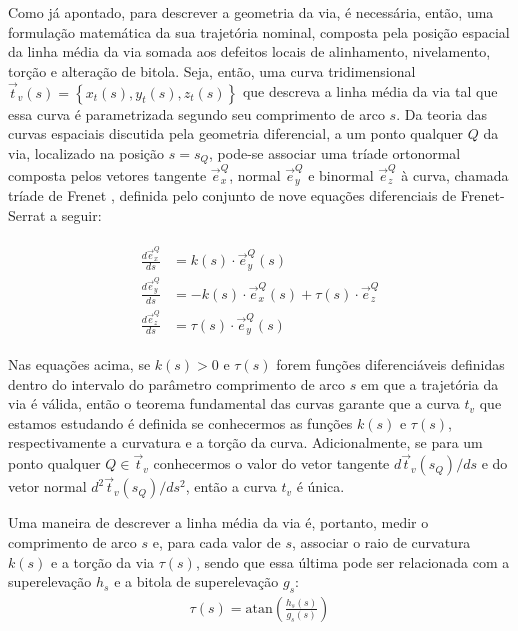 Como já apontado, para descrever a geometria da via, é necessária, então, uma formulação matemática da sua trajetória nominal, composta pela posição espacial da linha média da via somada aos defeitos locais de alinhamento, nivelamento, torção e alteração de bitola. Seja, então, uma curva tridimensional $\vec{t}_v(s) = \left\{x_t(s),y_t(s),z_t(s)\right\}$ que descreva a linha média da via tal que essa curva é parametrizada segundo seu comprimento de arco $s$. Da teoria das curvas espaciais discutida pela geometria diferencial, a um ponto qualquer $Q$ da via, localizado na posição $s=s_Q$, pode-se associar uma tríade ortonormal composta pelos vetores tangente $\vec{e}_x^Q$, normal $\vec{e}_y^Q$ e binormal $\vec{e}_z^Q$ à curva, chamada tríade de Frenet \cite{tenenblat_introducao_2008}, definida pelo conjunto de nove equações diferenciais de Frenet-Serrat a seguir:

\begin{align}
    \begin{split}
        \frac{d\vec{e}_x^Q}{ds} &= k(s)\cdot \vec{e}_y^Q(s) \\
        \frac{d\vec{e}_y^Q}{ds} &= -k(s)\cdot \vec{e}_x^Q(s) + \tau(s)\cdot\vec{e}_z^Q \\
        \frac{d\vec{e}_z^Q}{ds} &= \tau(s)\cdot \vec{e}_y^Q(s)
    \end{split}
    \label{eq: equações de Frenet-Serrat}
\end{align}

Nas equações acima, se $k(s) > 0 $ e $\tau(s)$ forem funções diferenciáveis definidas dentro do intervalo do parâmetro comprimento de arco $s$ em que a trajetória da via é válida, então o teorema fundamental das curvas garante que a curva $t_v$ que estamos estudando é definida se conhecermos as funções $k(s)$ e $\tau(s)$, respectivamente a curvatura e a torção da curva. Adicionalmente, se para um ponto qualquer $Q\in \vec{t}_v$ conhecermos o valor do vetor tangente $d\vec{t}_v(s_Q)/ds$ e do vetor normal $d^2\vec{t}_v(s_Q)/ds^2$, então a curva $t_v$ é única.

Uma maneira de descrever a linha média da via é, portanto, medir o comprimento de arco $s$ e, para cada valor de $s$, associar o raio de curvatura $k(s)$ e a torção da via $\tau(s)$, sendo que essa última pode ser relacionada com a superelevação $h_s$ e a bitola de superelevação $g_s$:
\begin{align}
    \tau(s) = \mathrm{atan}\left({\frac{h_s(s)}{g_s(s)}}\right)
\end{align}


